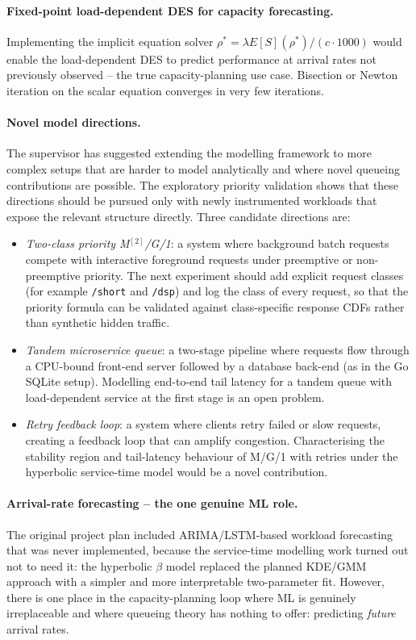 \paragraph{Fixed-point load-dependent DES for capacity forecasting.}
Implementing the implicit equation solver $\rho^* = \lambda E[S](\rho^*) / (c \cdot 1000)$ would enable the load-dependent DES to predict performance at arrival rates not previously observed -- the true capacity-planning use case. Bisection or Newton iteration on the scalar equation converges in very few iterations.

\paragraph{Novel model directions.}
The supervisor has suggested extending the modelling framework to more complex setups that are harder to model analytically and where novel queueing contributions are possible. The exploratory priority validation shows that these directions should be pursued only with newly instrumented workloads that expose the relevant structure directly. Three candidate directions are:
\begin{itemize}
    \item \emph{Two-class priority M$^{[2]}$/G/1}: a system where background batch requests compete with interactive foreground requests under preemptive or non-preemptive priority. The next experiment should add explicit request classes (for example \texttt{/short} and \texttt{/dsp}) and log the class of every request, so that the priority formula can be validated against class-specific response CDFs rather than synthetic hidden traffic.
    \item \emph{Tandem microservice queue}: a two-stage pipeline where requests flow through a CPU-bound front-end server followed by a database back-end (as in the Go SQLite setup). Modelling end-to-end tail latency for a tandem queue with load-dependent service at the first stage is an open problem.
    \item \emph{Retry feedback loop}: a system where clients retry failed or slow requests, creating a feedback loop that can amplify congestion. Characterising the stability region and tail-latency behaviour of M/G/1 with retries under the hyperbolic service-time model would be a novel contribution.
\end{itemize}

\paragraph{Arrival-rate forecasting -- the one genuine ML role.}
The original project plan included ARIMA/LSTM-based workload forecasting that was never implemented, because the service-time modelling work turned out not to need it: the hyperbolic $\beta$ model replaced the planned KDE/GMM approach with a simpler and more interpretable two-parameter fit. However, there is one place in the capacity-planning loop where ML is genuinely irreplaceable and where queueing theory has nothing to offer: predicting \emph{future} arrival rates.

